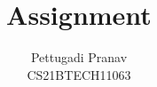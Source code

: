 \documentclass[journal,12pt,twocolumn]{IEEEtran}
\begin{document}
\let\vec\mathbf
\renewcommand{\thefigure}{\theproblem}
\def\putbox#1#2#3{\makebox[0in][l]{\makebox[#1][l]{}\raisebox{\baselineskip}[0in][0in]{\raisebox{#2}[0in][0in]{#3}}}}
     \def\rightbox#1{\makebox[0in][r]{#1}}
     \def\centbox#1{\makebox[0in]{#1}}
     \def\topbox#1{\raisebox{-\baselineskip}[0in][0in]{#1}}
     \def\midbox#1{\raisebox{-0.5\baselineskip}[0in][0in]{#1}}
\title{
	Assignment
}
\author{ Pettugadi Pranav\\CS21BTECH11063%
}	
%
%
%
% 
%
\end{document}
